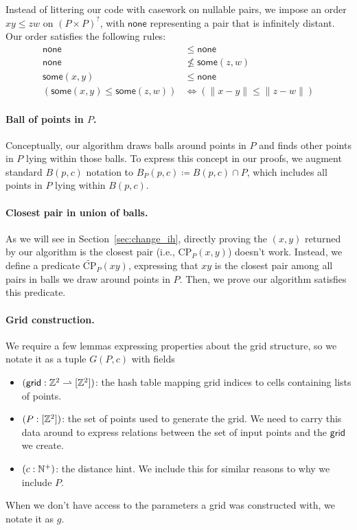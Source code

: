 \documentclass{article}
\begin{document}
Instead of littering our code with casework on nullable pairs, we impose an order $x\!y \leq z\!w$ on $(P \times P)^?$, with $\mathsf{none}$ representing a pair that is infinitely distant.
Our order satisfies the following rules:
\begin{align*}
  \mathsf{none} & \leq \mathsf{none} \\
  \mathsf{none} & \not\leq \mathsf{some}(z, w) \\
  \mathsf{some}(x, y) & \leq \mathsf{none} \\
  (\mathsf{some}(x, y) \leq \mathsf{some}(z, w)) &\Leftrightarrow (\|x - y\| \leq \|z - w\|)
\end{align*}

\paragraph{Ball of points in $P$.}
Conceptually, our algorithm draws balls around points in $P$ and finds other points in $P$ lying within those balls.
To express this concept in our proofs, we augment standard $B(p, c)$ notation to $B_{P}(p, c) \coloneqq B(p, c) \cap P$, which includes all points in $P$ lying within $B(p, c)$.

\paragraph{Closest pair in union of balls.}
As we will see in Section~\ref{sec:change_ih}, directly proving the $(x, y)$ returned by our algorithm is the closest pair (i.e., $\text{CP}_P(x, y)$) doesn't work.
Instead, we define a predicate $\widetilde{\text{CP}}_P(x\!y)$, expressing that $x\!y$ is the closest pair among all pairs in balls we draw around points in $P$.
Then, we prove our algorithm satisfies this predicate.

\paragraph{Grid construction.}
We require a few lemmas expressing properties about the grid structure, so we notate it as a tuple $G(P, c)$ with fields
\begin{itemize}
  \item $(\mathsf{grid} : \mathbb{Z}^2 \rightharpoonup [\mathbb{Z}^2])$: the hash table mapping grid indices to cells containing lists of points.
  \item $(P : [\mathbb{Z}^2])$: the set of points used to generate the grid.
  We need to carry this data around to express relations between the set of input points and the $\mathsf{grid}$ we create.
  \item $(c : \mathbb{N}^+)$: the distance hint.
  We include this for similar reasons to why we include $P$.
\end{itemize}
When we don't have access to the parameters a grid was constructed with, we notate it as $g$.
\end{document}
